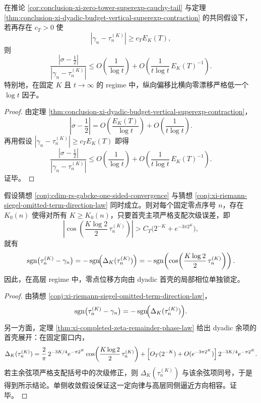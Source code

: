 \begin{theorem}\label{thm:conclusion-xi-horizontal-vertical-logt-splitting}
在推论 \ref{cor:conclusion-xi-zero-tower-superexp-cauchy-tail} 与定理 \ref{thm:conclusion-xi-dyadic-budget-vertical-superexp-contraction} 的共同假设下，若再存在 \(c_T>0\) 使
\[
|\gamma_n-\tau_n^{(K)}|\ge c_T E_K(T),
\]
则
\[
\frac{\left|\sigma-\frac12\right|}{|\gamma_n-\tau_n^{(K)}|}
\le
O\!\left(\frac{1}{\log t}\right)
+
O\!\left(\frac{1}{t\log t}\,E_K(T)^{-1}\right).
\]
特别地，在固定 \(K\) 且 \(t\to\infty\) 的 regime 中，纵向偏移比横向零漂移严格低一个 \(\log t\) 因子。
\end{theorem}
\begin{proof}
由定理 \ref{thm:conclusion-xi-dyadic-budget-vertical-superexp-contraction}，
\[
\left|\sigma-\frac12\right|
=
O\!\left(\frac{E_K(T)}{\log t}\right)
+
O\!\left(\frac{1}{t\log t}\right).
\]
再用假设 \( |\gamma_n-\tau_n^{(K)}|\ge c_T E_K(T)\) 即得
\[
\frac{\left|\sigma-\frac12\right|}{|\gamma_n-\tau_n^{(K)}|}
\le
O\!\left(\frac{1}{\log t}\right)
+
O\!\left(\frac{1}{t\log t}\,E_K(T)^{-1}\right).
\]
证毕。
\end{proof}

\begin{theorem}[在单侧收敛与首省略项方向猜想下的壳相位定向律]\label{thm:conclusion-xi-shell-phase-direction-under-conjectures}
假设猜想 \ref{conj:cdim-rs-gabcke-one-sided-convergence} 与猜想 \ref{conj:xi-riemann-siegel-omitted-term-direction-law} 同时成立。则对每个固定零点序号 \(n\)，存在 \(K_0(n)\) 使得对所有 \(K\ge K_0(n)\)，只要首壳主项严格支配次级误差，即
\[
\left|
\cos\!\left(\frac{K\log2}{2}\,\tau_n^{(K)}\right)
\right|
>
C_T\bigl(2^{-K}+e^{-3\pi 2^K}\bigr),
\]
就有
\[
\operatorname{sgn}\bigl(\tau_n^{(K)}-\gamma_n\bigr)
=
-\operatorname{sgn}\!\Bigl(\Delta_K(\tau_n^{(K)})\Bigr)
=
-\operatorname{sgn}\!\left(
\cos\!\left(\frac{K\log2}{2}\,\tau_n^{(K)}\right)
\right).
\]
因此，在高层 regime 中，零点位移方向由 dyadic 首壳的局部相位单独锁定。
\end{theorem}
\begin{proof}
由猜想 \ref{conj:xi-riemann-siegel-omitted-term-direction-law}，
\[
\operatorname{sgn}\bigl(\tau_n^{(K)}-\gamma_n\bigr)
=
-\operatorname{sgn}\!\Bigl(\Delta_K(\tau_n^{(K)})\Bigr).
\]
另一方面，定理 \ref{thm:xi-completed-zeta-remainder-phase-law} 给出 dyadic 余项的首壳展开：在固定窗口内，
\[
\Delta_K(\tau_n^{(K)})
=
\frac{2}{\pi}\,2^{-3K/4}e^{-\pi 2^K}
\cos\!\left(\frac{K\log2}{2}\,\tau_n^{(K)}\right)
+ \Bigl[O_T(2^{-K})+O(e^{-3\pi 2^K})\Bigr]\,
2^{-3K/4}e^{-\pi 2^K}.
\]
若主余弦项严格支配括号中的次级修正，则 \(\Delta_K(\tau_n^{(K)})\) 与该余弦项同号，于是得到所示结论。单侧收敛假设保证这一定向律与高层同侧逼近方向相容。证毕。
\end{proof}

